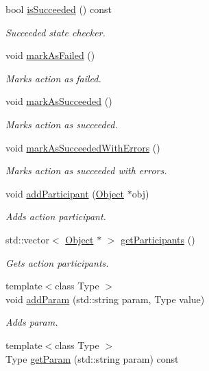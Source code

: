 \begin{DoxyCompactItemize}
bool \hyperlink{classAction_a5a17dd84ebf54e818df7d0d3e4ec8266}{is\-Succeeded} () const 
\begin{DoxyCompactList}\small\item\em Succeeded state checker. \end{DoxyCompactList}\item 
void \hyperlink{classAction_aae9f9b7922b0c2dffafba4f13402312c}{mark\-As\-Failed} ()
\begin{DoxyCompactList}\small\item\em Marks action as failed. \end{DoxyCompactList}\item 
void \hyperlink{classAction_ae1e98bdf1d1caa884db07c23f8eb322b}{mark\-As\-Succeeded} ()
\begin{DoxyCompactList}\small\item\em Marks action as succeeded. \end{DoxyCompactList}\item 
void \hyperlink{classAction_ac7b59d155f6b3426d75d2d689bf8648d}{mark\-As\-Succeeded\-With\-Errors} ()
\begin{DoxyCompactList}\small\item\em Marks action as succeeded with errors. \end{DoxyCompactList}\item 
void \hyperlink{classAction_aae2912142691704bc9a61108fcb83205}{add\-Participant} (\hyperlink{classObject}{Object} $\ast$obj)
\begin{DoxyCompactList}\small\item\em Adds action participant. \end{DoxyCompactList}\item 
std\-::vector$<$ \hyperlink{classObject}{Object} $\ast$ $>$ \hyperlink{classAction_a69c59ae9452d9c712cbf75b1647da3ce}{get\-Participants} ()
\begin{DoxyCompactList}\small\item\em Gets action participants. \end{DoxyCompactList}\item 
{\footnotesize template$<$class Type $>$ }\\void \hyperlink{classAction_ad093732911838eabbdbe5ec48300b6c0}{add\-Param} (std\-::string param, Type value)
\begin{DoxyCompactList}\small\item\em Adds param. \end{DoxyCompactList}\item 
{\footnotesize template$<$class Type $>$ }\\Type \hyperlink{classAction_abd2f3f78fc31cf97cfd380bc69272e2b}{get\-Param} (std\-::string param) const 

\end{DoxyCompactItemize}
